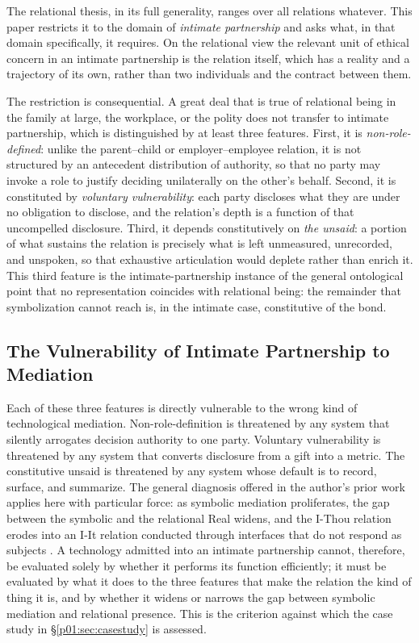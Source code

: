 The relational thesis, in its full generality, ranges over all relations whatever. This paper restricts it to the domain of \emph{intimate partnership} and asks what, in that domain specifically, it requires. On the relational view the relevant unit of ethical concern in an intimate partnership is the relation itself, which has a reality and a trajectory of its own, rather than two individuals and the contract between them.

The restriction is consequential. A great deal that is true of relational being in the family at large, the workplace, or the polity does not transfer to intimate partnership, which is distinguished by at least three features. First, it is \emph{non-role-defined}: unlike the parent--child or employer--employee relation, it is not structured by an antecedent distribution of authority, so that no party may invoke a role to justify deciding unilaterally on the other's behalf. Second, it is constituted by \emph{voluntary vulnerability}: each party discloses what they are under no obligation to disclose, and the relation's depth is a function of that uncompelled disclosure. Third, it depends constitutively on \emph{the unsaid}: a portion of what sustains the relation is precisely what is left unmeasured, unrecorded, and unspoken, so that exhaustive articulation would deplete rather than enrich it. This third feature is the intimate-partnership instance of the general ontological point that no representation coincides with relational being: the remainder that symbolization cannot reach is, in the intimate case, constitutive of the bond.

\subsection{The Vulnerability of Intimate Partnership to Mediation}

Each of these three features is directly vulnerable to the wrong kind of technological mediation. Non-role-definition is threatened by any system that silently arrogates decision authority to one party. Voluntary vulnerability is threatened by any system that converts disclosure from a gift into a metric. The constitutive unsaid is threatened by any system whose default is to record, surface, and summarize. The general diagnosis offered in the author's prior work applies here with particular force: as symbolic mediation proliferates, the gap between the symbolic and the relational Real widens, and the I-Thou relation erodes into an I-It relation conducted through interfaces that do not respond as subjects \parencite{huang2025relational, buber1937iandthou}. A technology admitted into an intimate partnership cannot, therefore, be evaluated solely by whether it performs its function efficiently; it must be evaluated by what it does to the three features that make the relation the kind of thing it is, and by whether it widens or narrows the gap between symbolic mediation and relational presence. This is the criterion against which the case study in §\ref{p01:sec:casestudy} is assessed.

